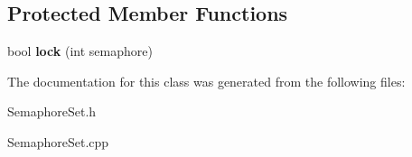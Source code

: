 \subsection*{Protected Member Functions}
\begin{DoxyCompactItemize}
\item 
bool {\bfseries lock} (int semaphore)\hypertarget{classSemaphoreSet_afeab9e90c4ee63c161159b1d65c9b2be}{}\label{classSemaphoreSet_afeab9e90c4ee63c161159b1d65c9b2be}

\end{DoxyCompactItemize}


The documentation for this class was generated from the following files\+:\begin{DoxyCompactItemize}
\item 
Semaphore\+Set.\+h\item 
Semaphore\+Set.\+cpp\end{DoxyCompactItemize}

